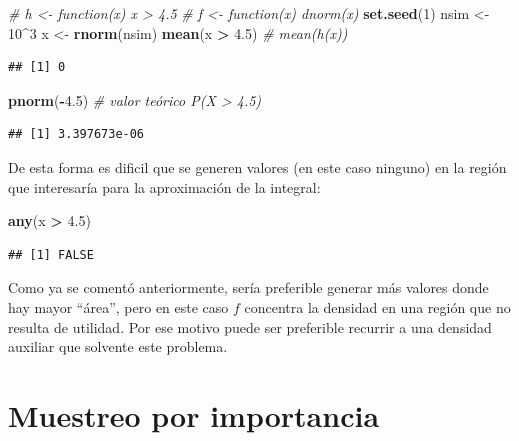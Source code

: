 \documentclass[
]{book}
\newenvironment{Shaded}{\begin{snugshade}}{\end{snugshade}}
\newcommand{\CommentTok}[1]{\textcolor[rgb]{0.56,0.35,0.01}{\textit{#1}}}
\newcommand{\DecValTok}[1]{\textcolor[rgb]{0.00,0.00,0.81}{#1}}
\newcommand{\FloatTok}[1]{\textcolor[rgb]{0.00,0.00,0.81}{#1}}
\newcommand{\KeywordTok}[1]{\textcolor[rgb]{0.13,0.29,0.53}{\textbf{#1}}}
\newcommand{\NormalTok}[1]{#1}
\newcommand{\OperatorTok}[1]{\textcolor[rgb]{0.81,0.36,0.00}{\textbf{#1}}}
\newcommand{\StringTok}[1]{\textcolor[rgb]{0.31,0.60,0.02}{#1}}
\theoremstyle{break}
\theoremstyle{definition}
\theoremstyle{definition}
\theoremstyle{definition}
\theoremstyle{remark}
\begin{document}
\begin{Shaded}
\begin{Highlighting}[]
\CommentTok{# h <- function(x) x > 4.5}
\CommentTok{# f <- function(x) dnorm(x)}
\KeywordTok{set.seed}\NormalTok{(}\DecValTok{1}\NormalTok{)}
\NormalTok{nsim <-}\StringTok{ }\DecValTok{10}\OperatorTok{^}\DecValTok{3}
\NormalTok{x <-}\StringTok{ }\KeywordTok{rnorm}\NormalTok{(nsim)}
\KeywordTok{mean}\NormalTok{(x }\OperatorTok{>}\StringTok{ }\FloatTok{4.5}\NormalTok{) }\CommentTok{# mean(h(x))}
\end{Highlighting}
\end{Shaded}

\begin{verbatim}
## [1] 0
\end{verbatim}

\begin{Shaded}
\begin{Highlighting}[]
\KeywordTok{pnorm}\NormalTok{(}\OperatorTok{-}\FloatTok{4.5}\NormalTok{)  }\CommentTok{# valor teórico P(X > 4.5) }
\end{Highlighting}
\end{Shaded}

\begin{verbatim}
## [1] 3.397673e-06
\end{verbatim}

De esta forma es dificil que se generen valores (en este caso ninguno)
en la región que interesaría para la aproximación de la integral:

\begin{Shaded}
\begin{Highlighting}[]
\KeywordTok{any}\NormalTok{(x }\OperatorTok{>}\StringTok{ }\FloatTok{4.5}\NormalTok{)}
\end{Highlighting}
\end{Shaded}

\begin{verbatim}
## [1] FALSE
\end{verbatim}

Como ya se comentó anteriormente, sería preferible generar más valores donde hay mayor ``área'',
pero en este caso \(f\) concentra la densidad en una región que no resulta de utilidad.
Por ese motivo puede ser preferible recurrir a una densidad auxiliar que solvente este problema.

\hypertarget{muestreo-por-importancia}{%
\section{Muestreo por importancia}\label{muestreo-por-importancia}}
\end{document}
